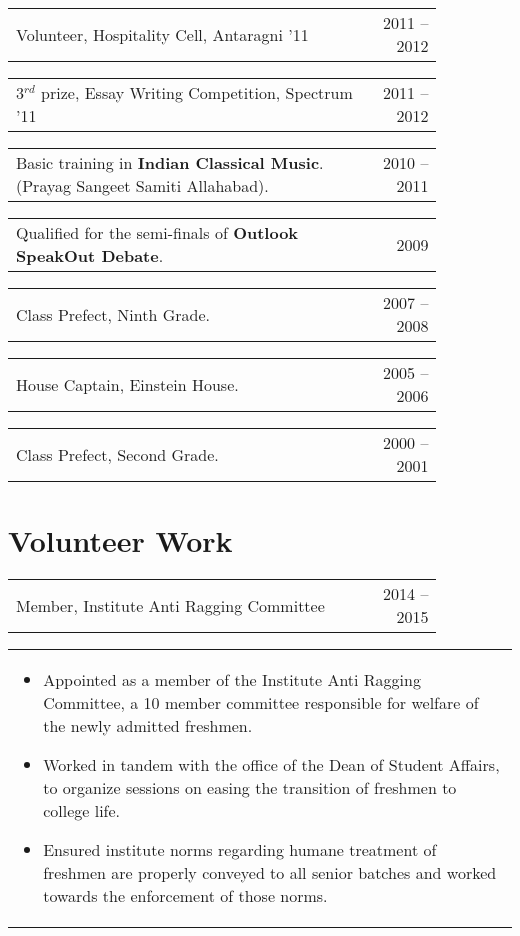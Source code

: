\documentclass[a4paper,10pt]{article} %
\newcommand{\iproject}[3]{
    \begin{tabular}{p{0.85\linewidth}r}
        \textcolor{NavyBlue}{#2} & \multicolumn{1}{m{3cm}}{\raggedleft \textsc{#1}}\\
    \end{tabular}
    \begin{tabular}{p{\linewidth}}
    \vspace{-0.3cm}
        \footnotesize{#3}
    \end{tabular}
    \vspace{-0.5cm}
}
\newcommand{\skill}[2]{
    \begin{tabular}{p{0.85\linewidth}r}
        #2 & \multicolumn{1}{m{3cm}}{\raggedleft \textsc{#1}}\\
    \end{tabular}
    \vspace{-0.5cm}
}
\begin{document}
\skill {2011 -- 2012}
       {Volunteer, Hospitality Cell, Antaragni '11}

\skill {2011 -- 2012}
       {3$^{rd}$ prize, Essay Writing Competition, Spectrum '11}

\skill {2010 -- 2011}
       {Basic training in \textbf{Indian Classical Music}. (Prayag Sangeet Samiti Allahabad).}

\skill {2009}
       {Qualified for the semi-finals of \textbf{Outlook SpeakOut Debate}.}

\skill {2007 -- 2008}
       {Class Prefect, Ninth Grade.}

\skill {2005 -- 2006}
       {House Captain, Einstein House.}

\skill {2000 -- 2001}
       {Class Prefect, Second Grade.}


\section{Volunteer Work}

\iproject {2014 -- 2015}
          {Member, Institute Anti Ragging Committee}
          {
               \begin{itemize}[leftmargin=0.5cm]
                   \item Appointed as a member of the Institute Anti Ragging Committee, a 10 member committee responsible
                       for welfare of the newly admitted freshmen.
                   \item Worked in tandem with the office of the Dean of Student Affairs, to organize sessions
                       on easing the transition of freshmen to college life.
                   \item Ensured institute norms regarding humane treatment of freshmen are properly conveyed to all senior batches
                       and worked towards the enforcement of those norms.
               \end{itemize}
          }
\end{document}
